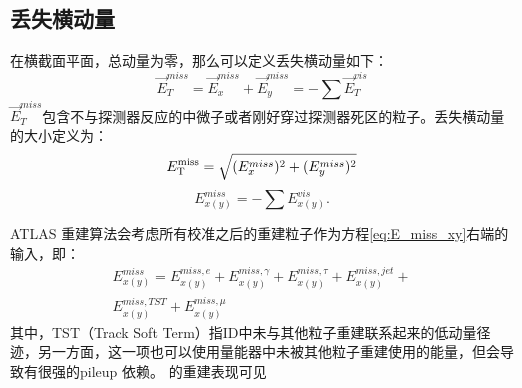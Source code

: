 \subsection{丢失横动量}\label{subsec:met_reco}
在横截面平面，总动量为零，那么可以定义丢失横动量如下：
\begin{equation}
\overrightarrow{E}_{T}^{miss}=\overrightarrow{E}_{x}^{miss}+\overrightarrow{E}_{y}^{miss}=-\sum \overrightarrow{E}_{T}^{vis}
\end{equation}
$\overrightarrow{E}_{T}^{miss}$包含不与探测器反应的中微子或者刚好穿过探测器死区的粒子。丢失横动量的大小定义为：
\begin{equation}
 E_{\text{T}}^{\text{miss}}=\sqrt{(E_x^{miss})^2+(E_y^{miss})^2}
\end{equation}
\begin{equation}\label{eq:E_miss_xy}
  E_{x(y)}^{miss}=-\sum E_{x(y)}^{vis}.
\end{equation}

ATLAS \met 重建算法\cite{Aaboud:2018tkc}会考虑所有校准之后的重建粒子作为方程\ref{eq:E_miss_xy}右端的输入，即：
\begin{equation}
\begin{aligned}
 E_{x(y)}^{miss}=E_{x(y)}^{miss,e}+E_{x(y)}^{miss,\gamma}+E_{x(y)}^{miss,\tau}+E_{x(y)}^{miss,jet}+\\
 E_{x(y)}^{miss,TST}+E_{x(y)}^{miss,\mu}
 \end{aligned}
\end{equation}
其中，TST（Track Soft Term）指ID中未与其他粒子重建联系起来的低动量径迹，另一方面，这一项也可以使用量能器中未被其他粒子重建使用的能量，但会导致\met 有很强的pileup 依赖。
\met 的重建表现可见\cite{Aaboud:2018tkc}
